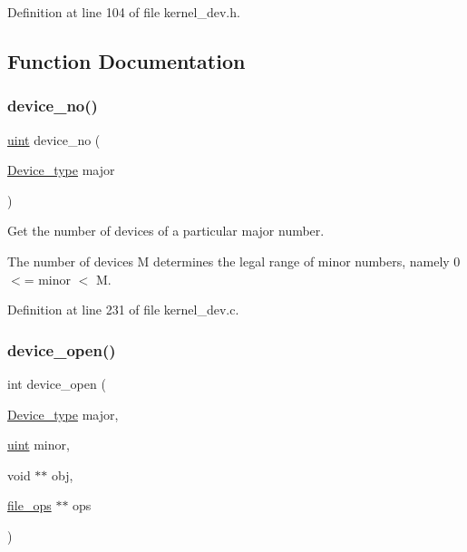 Definition at line 104 of file kernel\+\_\+dev.\+h.



\subsection{Function Documentation}
\mbox{\label{group__dev_ga0808cf584a510e0eff6908a5313ce296}} 
\subsubsection{\texorpdfstring{device\+\_\+no()}{device\_no()}}
{\footnotesize\ttfamily \hyperlink{bios_8h_a91ad9478d81a7aaf2593e8d9c3d06a14}{uint} device\+\_\+no (\begin{DoxyParamCaption}\item[{\hyperlink{group__dev_ga879ceac20e83b2375e5b49f4379b0c90}{Device\+\_\+type}}]{major }\end{DoxyParamCaption})}



Get the number of devices of a particular major number. 

The number of devices M determines the legal range of minor numbers, namely 0$<$= minor $<$ M. 

Definition at line 231 of file kernel\+\_\+dev.\+c.

\mbox{\label{group__dev_ga6d8e08550640c9819aa07b6bba9fa6ed}} 
\subsubsection{\texorpdfstring{device\+\_\+open()}{device\_open()}}
{\footnotesize\ttfamily int device\+\_\+open (\begin{DoxyParamCaption}\item[{\hyperlink{group__dev_ga879ceac20e83b2375e5b49f4379b0c90}{Device\+\_\+type}}]{major,  }\item[{\hyperlink{bios_8h_a91ad9478d81a7aaf2593e8d9c3d06a14}{uint}}]{minor,  }\item[{void $\ast$$\ast$}]{obj,  }\item[{\hyperlink{group__dev_gaab625d8ae3a95e942ed10ed1579f5042}{file\+\_\+ops} $\ast$$\ast$}]{ops }\end{DoxyParamCaption})}



